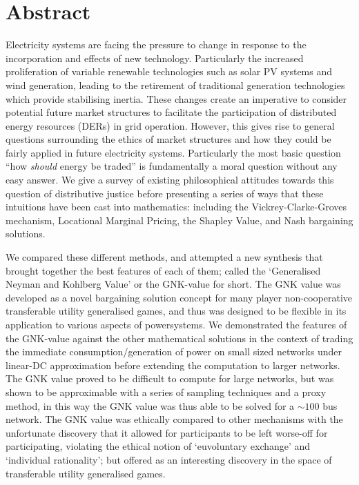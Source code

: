 \chapter*{Abstract}
\vspace{-1em}


Electricity systems are facing the pressure to change in response to the incorporation and effects of new technology.
Particularly the increased proliferation of variable renewable technologies such as solar PV systems and wind generation, leading to the retirement of traditional generation technologies which provide stabilising inertia.
These changes create an imperative to consider potential future market structures to facilitate the participation of distributed energy resources (DERs) in grid operation.
However, this gives rise to general questions surrounding the ethics of market structures and how they could be fairly applied in future electricity systems. Particularly the most basic question ``how \textit{should} energy be traded'' is fundamentally a moral question without any easy answer.
We give a survey of existing philosophical attitudes towards this question of distributive justice before presenting a series of ways that these intuitions have been cast into mathematics: including the Vickrey-Clarke-Groves mechanism, Locational Marginal Pricing, the Shapley Value, and Nash bargaining solutions.

We compared these different methods, and attempted a new synthesis that brought together the best features of each of them; called the `Generalised Neyman and Kohlberg Value' or the GNK-value for short.
The GNK value was developed as a novel bargaining solution concept for many player non-cooperative transferable utility generalised games, and thus was designed to be flexible in its application to various aspects of powersystems.
We demonstrated the features of the GNK-value against the other mathematical solutions in the context of trading the immediate consumption/generation of power on small sized networks under linear-DC approximation before extending the computation to larger networks.
The GNK value proved to be difficult to compute for large networks, but was shown to be approximable with a series of sampling techniques and a proxy method, in this way the GNK value was thus able to be solved for a $\sim 100$ bus network.
The GNK value was ethically compared to other mechanisms with the unfortunate discovery that it allowed for participants to be left worse-off for participating, violating the ethical notion of `euvoluntary exchange' and `individual rationality'; but offered as an interesting discovery in the space of transferable utility generalised games.

